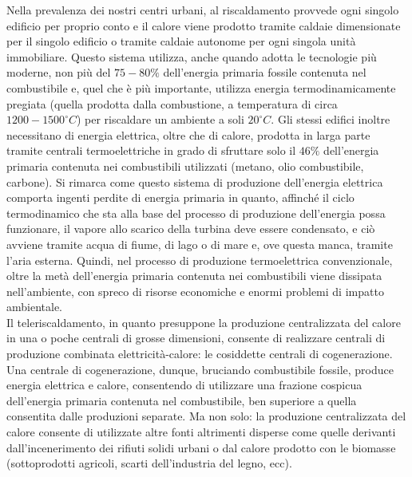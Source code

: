 \documentclass[laurea,oneside,11pt]{USiena_tesiLM}
\begin{document}
Nella prevalenza dei nostri centri urbani, al riscaldamento provvede ogni singolo edificio per proprio conto e il calore viene prodotto tramite caldaie dimensionate per il singolo edificio o tramite caldaie autonome per ogni singola unità immobiliare.
Questo sistema utilizza, anche quando adotta le tecnologie più moderne, non più del $75-80\%$ dell'energia primaria fossile contenuta nel combustibile e, quel che è più importante, utilizza energia termodinamicamente pregiata (quella prodotta dalla combustione, a temperatura di circa $1200-1500 ^{\circ}C$) per riscaldare un ambiente a soli $20 ^{\circ}C$.
Gli stessi edifici inoltre necessitano di energia elettrica, oltre che di calore, prodotta in larga parte tramite centrali termoelettriche in grado di sfruttare solo il $46\%$ dell'energia primaria contenuta nei combustibili utilizzati (metano, olio combustibile, carbone).
Si rimarca come questo sistema di produzione dell'energia elettrica comporta ingenti perdite di energia primaria in quanto, affinché il ciclo termodinamico che sta alla base del processo di produzione dell'energia possa funzionare, il vapore allo scarico della turbina deve essere condensato, e ciò avviene tramite acqua di fiume, di lago o di mare e, ove questa manca, tramite l'aria esterna. Quindi, nel processo di produzione termoelettrica convenzionale, oltre la metà dell'energia primaria contenuta nei combustibili viene dissipata nell'ambiente, con spreco di risorse economiche e enormi problemi di impatto ambientale.\\

Il teleriscaldamento, in quanto presuppone la produzione centralizzata del calore in una o poche centrali di grosse dimensioni, consente di realizzare centrali di produzione combinata elettricità-calore: le cosiddette  centrali di cogenerazione.
Una centrale di cogenerazione, dunque, bruciando combustibile fossile, produce energia elettrica e calore, consentendo di utilizzare una frazione cospicua dell'energia primaria contenuta nel combustibile, ben superiore a quella consentita dalle produzioni separate.
Ma non solo: la produzione centralizzata del calore consente di utilizzate altre fonti altrimenti disperse come quelle derivanti dall'incenerimento dei rifiuti solidi urbani o dal calore prodotto con le biomasse (sottoprodotti agricoli, scarti dell'industria del legno, ecc).\\
\end{document}
